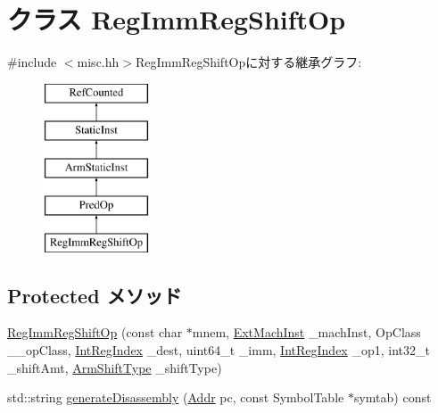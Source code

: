 \hypertarget{classRegImmRegShiftOp}{
\section{クラス RegImmRegShiftOp}
\label{classRegImmRegShiftOp}
}


{\ttfamily \#include $<$misc.hh$>$}RegImmRegShiftOpに対する継承グラフ:\begin{figure}[H]
\begin{center}
\leavevmode
\includegraphics[height=5cm]{classRegImmRegShiftOp}
\end{center}
\end{figure}
\subsection*{Protected メソッド}
\begin{DoxyCompactItemize}
\item 
\hyperlink{classRegImmRegShiftOp_a6ac5b901d95dfce68c0666393d0c0a6e}{RegImmRegShiftOp} (const char $\ast$mnem, \hyperlink{classStaticInst_a5605d4fc727eae9e595325c90c0ec108}{ExtMachInst} \_\-machInst, OpClass \_\-\_\-opClass, \hyperlink{namespaceArmISA_ae64680ba9fb526106829d6bf92fc791b}{IntRegIndex} \_\-dest, uint64\_\-t \_\-imm, \hyperlink{namespaceArmISA_ae64680ba9fb526106829d6bf92fc791b}{IntRegIndex} \_\-op1, int32\_\-t \_\-shiftAmt, \hyperlink{namespaceArmISA_a209d79feaaef0aa2f54ae62e53ee90de}{ArmShiftType} \_\-shiftType)
\item 
std::string \hyperlink{classRegImmRegShiftOp_a95d323a22a5f07e14d6b4c9385a91896}{generateDisassembly} (\hyperlink{classm5_1_1params_1_1Addr}{Addr} pc, const SymbolTable $\ast$symtab) const 
\end{DoxyCompactItemize}
